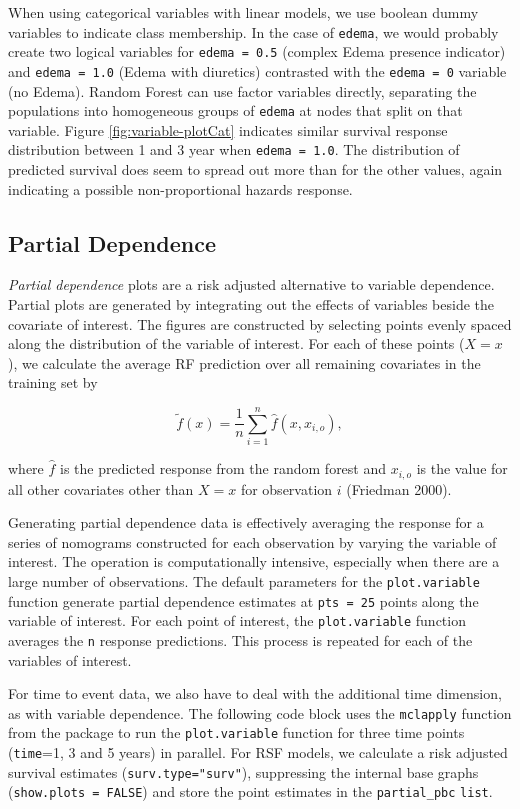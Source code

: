 \documentclass[article, nojss]{jss}
\begin{document}
When using categorical variables with linear models, we use boolean
dummy variables to indicate class membership. In the case of
\texttt{edema}, we would probably create two logical variables for
\texttt{edema\ =\ 0.5} (complex Edema presence indicator) and
\texttt{edema\ =\ 1.0} (Edema with diuretics) contrasted with the
\texttt{edema\ =\ 0} variable (no Edema). Random Forest can use factor
variables directly, separating the populations into homogeneous groups
of \texttt{edema} at nodes that split on that variable. Figure
\ref{fig:variable-plotCat} indicates similar survival response
distribution between 1 and 3 year when \texttt{edema\ =\ 1.0}. The
distribution of predicted survival does seem to spread out more than for
the other values, again indicating a possible non-proportional hazards
response.

\subsection{Partial Dependence}\label{partial-dependence}

\emph{Partial dependence} plots are a risk adjusted alternative to
variable dependence. Partial plots are generated by integrating out the
effects of variables beside the covariate of interest. The figures are
constructed by selecting points evenly spaced along the distribution of
the variable of interest. For each of these points (\(X = x\)), we
calculate the average RF prediction over all remaining covariates in the
training set by

\[
\tilde{f}(x) = \frac{1}{n} \sum_{i = 1}^n \hat{f}(x, x_{i, o}),
\label{E:partial}
\]

where \(\hat{f}\) is the predicted response from the random forest and
\(x_{i, o}\) is the value for all other covariates other than \(X = x\)
for observation \(i\) (Friedman 2000).

Generating partial dependence data is effectively averaging the response
for a series of nomograms constructed for each observation by varying
the variable of interest. The operation is computationally intensive,
especially when there are a large number of observations. The default
parameters for the \texttt{plot.variable} function generate partial
dependence estimates at \texttt{pts\ =\ 25} points along the variable of
interest. For each point of interest, the \texttt{plot.variable}
function averages the \texttt{n} response predictions. This process is
repeated for each of the variables of interest.

For time to event data, we also have to deal with the additional time
dimension, as with variable dependence. The following code block uses
the \texttt{mclapply} function from the  package to run
the \texttt{plot.variable} function for three time points
(\texttt{time}=1, 3 and 5 years) in parallel. For RSF models, we
calculate a risk adjusted survival estimates
(\texttt{surv.type="surv"}), suppressing the internal base graphs
(\texttt{show.plots\ =\ FALSE}) and store the point estimates in the
\texttt{partial\_pbc} \texttt{list}.
\end{document}

